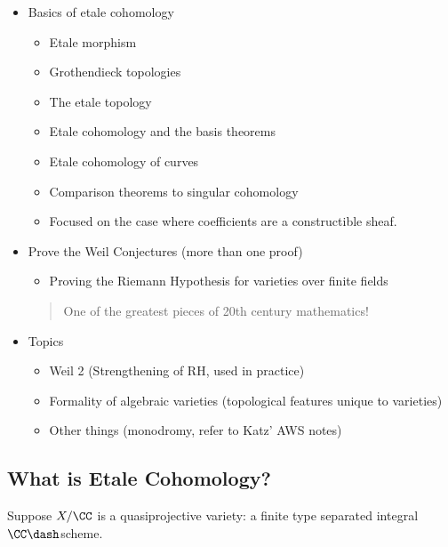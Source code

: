 \begin{itemize}
\tightlist
\item
  Basics of etale cohomology

  \begin{itemize}
  \tightlist
  \item
    Etale morphism
  \item
    Grothendieck topologies
  \item
    The etale topology
  \item
    Etale cohomology and the basis theorems
  \item
    Etale cohomology of curves
  \item
    Comparison theorems to singular cohomology
  \item
    Focused on the case where coefficients are a constructible sheaf.
  \end{itemize}
\item
  Prove the Weil Conjectures (more than one proof)

  \begin{itemize}
  \tightlist
  \item
    Proving the Riemann Hypothesis for varieties over finite fields
  \end{itemize}

  \begin{quote}
  One of the greatest pieces of 20th century mathematics!
  \end{quote}
\item
  Topics

  \begin{itemize}
  \tightlist
  \item
    Weil 2 (Strengthening of RH, used in practice)
  \item
    Formality of algebraic varieties (topological features unique to
    varieties)
  \item
    Other things (monodromy, refer to Katz' AWS notes)
  \end{itemize}
\end{itemize}

\hypertarget{what-is-etale-cohomology}{%
\subsection{What is Etale Cohomology?}\label{what-is-etale-cohomology}}

Suppose \(X/\CC\) is a quasiprojective variety: a finite type separated
integral \(\CC\dash\)scheme.

